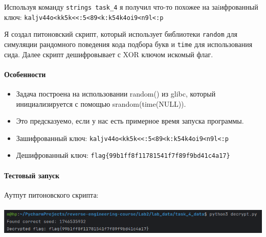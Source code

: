     Используя команду \texttt{strings task\_4} я получил что-то похожее на заiифрованный ключ: \texttt{kaljv44o<kk5k<<:5<89<k:k54k4oi9<n9l<:p}

    Я создал питоновский скрипт, который использует библиотеки \texttt{random} для симуляции рандомного поведения кода
    подбора букв и \texttt{time} для использования сида. Далее скрипт дешифровывает с XOR ключом искомый флаг.

    \paragraph{Особенности}
    \begin{itemize}
        \item Задача построена на использовании random() из glibc, который инициализируется с помощью srandom(time(NULL)).
        \item Это предсказуемо, если у нас есть примерное время запуска программы.
        \item Зашифрованный ключ: \texttt{kaljv44o<kk5k<<:5<89<k:k54k4oi9<n9l<:p}
        \item Дешифрованный ключ: \texttt{flag\{99b1ff8f11781541f7f89f9bd41c4a17\}}
    \end{itemize}
    
    \paragraph{Тестовый запуск}
    Аутпут питоновского скрипта:
    \paragraph{}
    \includegraphics[width=1\linewidth]{static/solution_task_4.png}

